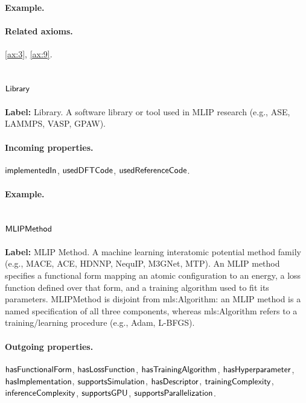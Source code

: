 \paragraph{Example.}

\paragraph{Related axioms.} \eqref{ax:3}, \eqref{ax:9}.

\subsection{$\mathsf{Library}$}
\label{sec:term-Library}

\textbf{Label:} Library.
A software library or tool used in MLIP research (e.g., ASE, LAMMPS, VASP, GPAW).

\paragraph{Incoming properties.} $\mathsf{implementedIn}$, $\mathsf{usedDFTCode}$, $\mathsf{usedReferenceCode}$.

\paragraph{Example.}

\subsection{$\mathsf{MLIPMethod}$}
\label{sec:term-MLIPMethod}

\textbf{Label:} MLIP Method.
A machine learning interatomic potential method family (e.g., MACE, ACE, HDNNP, NequIP, M3GNet, MTP). An MLIP method specifies a functional form mapping an atomic configuration to an energy, a loss function defined over that form, and a training algorithm used to fit its parameters. MLIPMethod is disjoint from mls:Algorithm: an MLIP method is a named specification of all three components, whereas mls:Algorithm refers to a training/learning procedure (e.g., Adam, L-BFGS).

\paragraph{Outgoing properties.} $\mathsf{hasFunctionalForm}$, $\mathsf{hasLossFunction}$, $\mathsf{hasTrainingAlgorithm}$, $\mathsf{hasHyperparameter}$, $\mathsf{hasImplementation}$, $\mathsf{supportsSimulation}$, $\mathsf{hasDescriptor}$, $\mathsf{trainingComplexity}$, $\mathsf{inferenceComplexity}$, $\mathsf{supportsGPU}$, $\mathsf{supportsParallelization}$.

